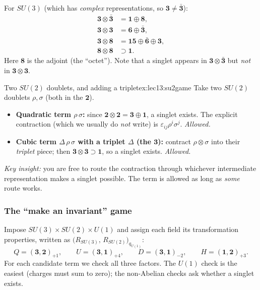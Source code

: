 \documentclass[../main.tex]{subfiles}
\begin{document}
For $SU(3)$ (which has \emph{complex} representations, so $\mathbf{3}\neq\bar{\mathbf{3}}$):
\begin{align}
  \mathbf{3}\otimes\bar{\mathbf{3}} &= \mathbf{1}\oplus\mathbf{8},
  \label{eq:lec13:su3_33bar}\\
  \mathbf{3}\otimes\mathbf{3} &= \mathbf{6}\oplus\bar{\mathbf{3}},
  \label{eq:lec13:su3_33}\\
  \mathbf{3}\otimes\mathbf{8} &= \mathbf{15}\oplus\bar{\mathbf{6}}\oplus\mathbf{3},
  \label{eq:lec13:su3_38}\\
  \mathbf{8}\otimes\mathbf{8} &\supset \mathbf{1}.
  \label{eq:lec13:su3_88}
\end{align}
Here $\mathbf{8}$ is the adjoint (the ``octet''). Note that a singlet appears in $\mathbf{3}\otimes\bar{\mathbf{3}}$ but \emph{not} in $\mathbf{3}\otimes\mathbf{3}$.

\begin{Example}{Two $SU(2)$ doublets, and adding a triplet}{ex:lec13:su2game}
Take two $SU(2)$ doublets $\rho,\sigma$ (both in the $\mathbf{2}$).
\begin{itemize}
  \item \textbf{Quadratic term $\rho\,\sigma$:} since $\mathbf{2}\otimes\mathbf{2}=\mathbf{3}\oplus\mathbf{1}$, a singlet exists. The explicit contraction (which we usually do \emph{not} write) is $\varepsilon_{ij}\rho^i\sigma^j$. \emph{Allowed.}
  \item \textbf{Cubic term $\Delta\,\rho\,\sigma$ with a triplet $\Delta$ (the $\mathbf{3}$):} contract $\rho\otimes\sigma$ into their \emph{triplet} piece; then $\mathbf{3}\otimes\mathbf{3}\supset\mathbf{1}$, so a singlet exists. \emph{Allowed.}
\end{itemize}
\end{Example}

\textit{Key insight:} you are free to route the contraction through whichever intermediate representation makes a singlet possible. The term is allowed as long as \emph{some} route works.

\subsubsection*{The ``make an invariant'' game}

Impose $SU(3)\times SU(2)\times U(1)$ and assign each field its transformation properties, written as $\big(R_{SU(3)},\,R_{SU(2)}\big)_{q_{U(1)}}$:
\begin{equation}
  Q = (\mathbf{3},\mathbf{2})_{+1},
  \qquad
  U = (\mathbf{3},\mathbf{1})_{+4},
  \qquad
  D = (\mathbf{3},\mathbf{1})_{-2},
  \qquad
  H = (\mathbf{1},\mathbf{2})_{+3}.
  \label{eq:lec13:gamefields}
\end{equation}
For each candidate term we check all three factors. The $U(1)$ check is the easiest (charges must sum to zero); the non-Abelian checks ask whether a singlet exists.
\end{document}

